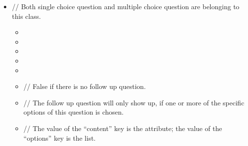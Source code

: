 \documentclass[a4paper]{scrreprt}
\begin{document}
{\begin{itemize}
                    \item {}
                        \par // Both single choice question and multiple choice question are belonging to this class.
                        \begin{itemize}
                            \item {}
                            \item {}
                            \item {}
                            \item {}
                            \item {}
                            \item {}
                                \par // False if there is no follow up question.
                            \item {}
                                \par // The follow up question will only show up, if one or more of the specific options of this question is chosen.
                            \item {}
                                \par // The value of the “content” key is the  attribute; the value of the “options” key is the  list.
                        \end{itemize}


\end{itemize}}
\end{document}
